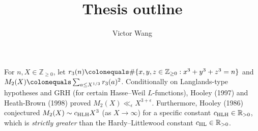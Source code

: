 \documentclass[12pt]{article}
\title{Thesis outline}
\author{Victor Wang}
\date{}
\begin{document}
\maketitle


For $n,X\in \mathbb{Z}_{\geq0}$,
let $r_3(n)\colonequals \#\{x,y,z\in \mathbb{Z}_{\geq0}: x^3+y^3+z^3=n\}$ and $M_2(X)\colonequals \sum_{a\leq X^{1/3}}r_3(a)^2$.
Conditionally on Langlands-type hypotheses and GRH (for certain Hasse--Weil $L$-functions),
Hooley (1997) and Heath-Brown (1998) proved $M_2(X)\ll_\epsilon X^{3+\epsilon}$.
Furthermore,
Hooley (1986) conjectured $M_2(X)\sim c_{\textnormal{HLH}}X^3$ (as $X\to\infty$) for a specific constant $c_{\textnormal{HLH}}\in \mathbb{R}_{>0}$,
which is \emph{strictly greater} than the Hardy--Littlewood constant $c_{\textnormal{HL}}\in \mathbb{R}_{>0}$.
\end{document}
